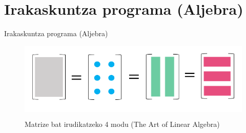 \documentclass[
 10pt,%
 compress,%
 t,       %
 xcolor=svgnames
]{beamer}
\theoremstyle{definition} \newtheorem{definicion}{Definicion}[section]
\theoremstyle{propiedades} \newtheorem{propiedades}{Propiedades}[section]
\begin{document}
%


%

%



%



\section[Irakaskuntza programa (Aljebra)] {Irakaskuntza programa (Aljebra)}

\begin{frame}{Irakaskuntza programa (Aljebra)} 
	
	

\begin{figure}
	\begin{minipage}{1.\textwidth}
		\colorbox{white}  
		{\includegraphics[width=1.\linewidth]{Matrix4Ways}}
		\centering \caption{\centering \tiny Matrize bat irudikatzeko 4 modu (The Art of Linear Algebra)}
	\end{minipage}
\end{figure}


\end{frame}
\end{document}
